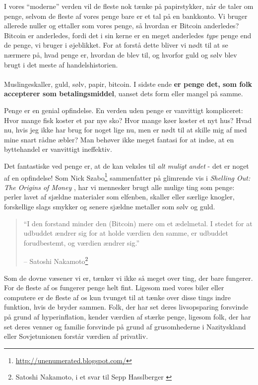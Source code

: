 \documentclass[paper=6in:9in,pagesize=pdftex,headinclude=on,footinclude=on,12pt]{scrbook}
\begin{document}
I vores \enquote{moderne} verden vil de fleste nok tænke på papirstykker, når de taler om penge, selvom de fleste af vores penge bare er et tal på en bankkonto. Vi bruger allerede nuller og ettaller som vores penge, så hvordan er Bitcoin anderledes? Bitcoin er anderledes, fordi det i sin kerne er en meget anderledes \textit{type} penge end de penge, vi bruger i øjeblikket. For at forstå dette bliver vi nødt til at se nærmere på, hvad penge er, hvordan de blev til, og hvorfor guld og sølv blev brugt i det meste af handelshistorien.\paragraph{} Muslingeskaller, guld, sølv, papir, bitcoin. I sidste ende \textbf{er penge det, som folk accepterer som betalingsmiddel}, uanset dets form eller mangel på samme.

Penge er en genial opfindelse. En verden uden penge er vanvittigt kompliceret: Hvor mange fisk koster et par nye sko? Hvor mange køer koster et nyt hus? Hvad nu, hvis jeg ikke har brug for noget lige nu, men er nødt til at skille mig af med mine snart rådne æbler? Man behøver ikke meget fantasi for at indse, at en byttehandel er vanvittigt ineffektiv.

Det fantastiske ved penge er, at de kan veksles til \textit{alt muligt andet} - det er noget af en opfindelse! Som Nick Szabo\footnote{\url{http://unenumerated.blogspot.com/}} sammenfatter på glimrende vis i \textit{Shelling Out: The Origins of Money} \cite{shelling-out}, har vi mennesker brugt alle mulige ting som penge: perler lavet af sjældne materialer som elfenben, skaller eller særlige knogler, forskellige slags smykker og senere sjældne metaller som sølv og guld.\begin{quotation}\begin{samepage} \enquote{I den forstand minder den (Bitcoin) mere om et ædelmetal. I stedet for at udbuddet ændrer sig for at holde værdien den samme, er udbuddet forudbestemt, og værdien ændrer sig.} \begin{flushright} -- Satoshi Nakamoto\footnote{Satoshi Nakamoto, i et svar til Sepp Hasslberger \cite{satoshi-precious-metal}}
\end{flushright}\end{samepage}\end{quotation}

Som de dovne væsener vi er, tænker vi ikke så meget over ting, der bare fungerer. For de fleste af os fungerer penge helt fint. Ligesom med vores biler eller computere er de fleste af os kun tvunget til at tænke over disse tings indre funktion, hvis de bryder sammen. Folk, der har set deres livsopsparing forsvinde på grund af hyperinflation, kender værdien af stærke penge, ligesom folk, der har set deres venner og familie forsvinde på grund af grusomhederne i Nazityskland eller Sovjetunionen forstår værdien af privatliv.
\end{document}
